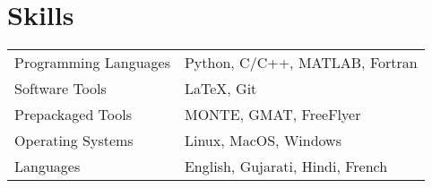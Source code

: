 \documentclass[letterpaper,12pt]{article}
\begin{document}
\section{Skills}
\begin{tabularx}{\linewidth}{@{}l X@{}}
Programming Languages  &  Python, C/C++, MATLAB, Fortran \\[3.75pt]
Software Tools  &  \LaTeX, Git \\[3.75pt]
Prepackaged Tools  &  MONTE, GMAT, FreeFlyer \\[3.75pt]
Operating Systems  &  Linux, MacOS, Windows \\[3.75pt]
Languages  &  English, Gujarati, Hindi, French \\[3.75pt]
\end{tabularx}

\end{document}
